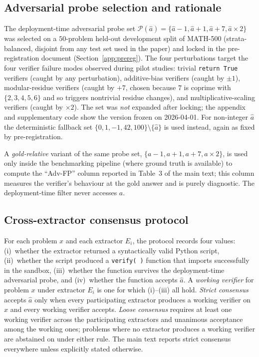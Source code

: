 \documentclass{article}
\begin{document}
\subsection{Adversarial probe selection and rationale}
\label{app:adv}

The deployment-time adversarial probe set
$\mathcal{P}(\hat a) = \{\hat a - 1, \hat a + 1, \hat a + 7, \hat a \times 2\}$
was selected on a $50$-problem held-out development split of MATH-500
(strata-balanced, disjoint from any test set used in the paper) and
locked in the pre-registration document
(Section~\ref{app:prereg}). The four perturbations target the four
verifier failure modes observed during pilot studies: trivial
\texttt{return True} verifiers (caught by any perturbation), additive-bias
verifiers (caught by $\pm 1$), modular-residue verifiers (caught by $+7$,
chosen because $7$ is coprime with $\{2,3,4,5,6\}$ and so triggers
nontrivial residue changes), and multiplicative-scaling verifiers
(caught by $\times 2$). The set was \emph{not} expanded after locking;
the appendix and supplementary code show the version frozen on
2026-04-01. For non-integer $\hat a$ the deterministic fallback set
$\{0, 1, -1, 42, 100\} \setminus \{\hat a\}$ is used instead, again as
fixed by pre-registration.

A \emph{gold-relative} variant of the same probe set,
$\{a - 1, a + 1, a + 7, a \times 2\}$, is used only inside the
benchmarking pipeline (where ground truth is available) to compute the
``Adv-FP'' column reported in Table~3 of the main text; this column
measures the verifier's behaviour at the gold answer and is purely
diagnostic. The deployment-time filter never accesses $a$.

\subsection{Cross-extractor consensus protocol}
\label{app:consensus}

For each problem $x$ and each extractor $E_i$, the protocol records four
values: (i)~whether the extractor returned a syntactically valid Python
script, (ii)~whether the script produced a \texttt{verify(\,)}
function that imports successfully in the sandbox, (iii)~whether the
function survives the deployment-time adversarial probe, and (iv)~whether
the function accepts $\hat a$. A \emph{working verifier} for problem $x$
under extractor $E_i$ is one for which (i)--(iii) all hold.
\emph{Strict consensus} accepts $\hat a$ only when every participating
extractor produces a working verifier on $x$ and every working verifier
accepts. \emph{Loose consensus} requires at least one working verifier
across the participating extractors and unanimous acceptance among the
working ones; problems where no extractor produces a working verifier
are abstained on under either rule. The main text reports strict
consensus everywhere unless explicitly stated otherwise.
\end{document}
